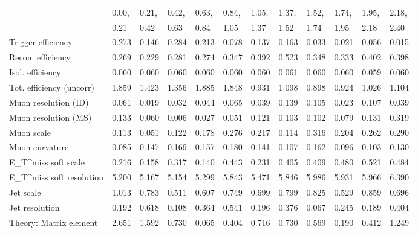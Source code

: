 \begin{tabular}{l|p{0.6cm}p{0.6cm}p{0.6cm}p{0.6cm}p{0.6cm}p{0.6cm}p{0.6cm}p{0.6cm}p{0.6cm}p{0.6cm}p{0.6cm}}
\hline
   & 0.00, & 0.21, & 0.42, & 0.63, & 0.84, & 1.05, & 1.37, & 1.52, & 1.74, & 1.95, & 2.18,  \\ 
   & 0.21 & 0.42 & 0.63 & 0.84 & 1.05 & 1.37 & 1.52 & 1.74 & 1.95 & 2.18 & 2.40  \\ 
\hline
Trigger efficiency                       & 0.273 & 0.146 & 0.284 & 0.213 & 0.078 & 0.137 & 0.163 & 0.033 & 0.021 & 0.056 & 0.015 \\
Recon. efficiency                        & 0.269 & 0.229 & 0.281 & 0.274 & 0.347 & 0.392 & 0.523 & 0.348 & 0.333 & 0.402 & 0.398 \\
Isol. efficiency                         & 0.060 & 0.060 & 0.060 & 0.060 & 0.060 & 0.060 & 0.061 & 0.060 & 0.060 & 0.059 & 0.060 \\
Tot. efficiency (uncorr)                 & 1.859 & 1.423 & 1.356 & 1.885 & 1.848 & 0.931 & 1.098 & 0.898 & 0.924 & 1.026 & 1.104 \\
Muon resolution (ID)                     & 0.061 & 0.019 & 0.032 & 0.044 & 0.065 & 0.039 & 0.139 & 0.105 & 0.023 & 0.107 & 0.039 \\
Muon resolution (MS)                     & 0.133 & 0.060 & 0.006 & 0.027 & 0.051 & 0.121 & 0.103 & 0.102 & 0.079 & 0.131 & 0.319 \\
Muon scale                               & 0.113 & 0.051 & 0.122 & 0.178 & 0.276 & 0.217 & 0.114 & 0.316 & 0.204 & 0.262 & 0.290 \\
Muon curvature                           & 0.085 & 0.147 & 0.169 & 0.157 & 0.180 & 0.141 & 0.107 & 0.162 & 0.096 & 0.103 & 0.130 \\
E_{T}^{miss} soft scale                  & 0.216 & 0.158 & 0.317 & 0.140 & 0.443 & 0.231 & 0.405 & 0.409 & 0.480 & 0.521 & 0.484 \\
E_{T}^{miss} soft resolution             & 5.200 & 5.167 & 5.154 & 5.299 & 5.843 & 5.471 & 5.846 & 5.986 & 5.931 & 5.966 & 6.390 \\
Jet scale                                & 1.013 & 0.783 & 0.511 & 0.607 & 0.749 & 0.699 & 0.799 & 0.825 & 0.529 & 0.859 & 0.696 \\
Jet resolution                           & 0.192 & 0.618 & 0.108 & 0.364 & 0.541 & 0.196 & 0.376 & 0.067 & 0.245 & 0.189 & 0.404 \\
Theory: Matrix element                   & 2.651 & 1.592 & 0.730 & 0.065 & 0.404 & 0.716 & 0.730 & 0.569 & 0.190 & 0.412 & 1.249 \\

\end{tabular}

